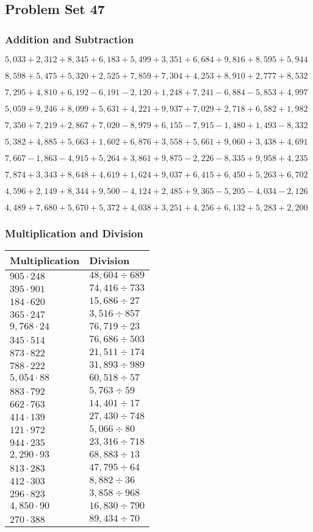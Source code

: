 \hypertarget{problem-set-47-2}{%
\subsection{Problem Set 47}\label{problem-set-47-2}}

\hypertarget{addition-and-subtraction-209}{%
\subsubsection{Addition and
Subtraction}\label{addition-and-subtraction-209}}

\(5,033+2,312+8,345+6,183+5,499+3,351+6,684+9,816+8,595+ 5,944\)

\(8,598+5,475+5,320+2,525+7,859+7,304+4,253+8,910+2,777+8,532\)

\(7,295+4,810+6,192-6,191-2,120+1,248+7,241-6,884-5,853+4,997\)

\(5,059+9,246+8,099+5,631+4,221+9,937+7,029+2,718+6,582+1,982\)

\(7,350+7,219+2,867+7,020-8,979+6,155-7,915-1,480+1,493-8,332\)

\(5,382+4,885+5,663+1,602+6,876+3,558+5,661+9,060+3,438+4,691\)

\(7,667-1,863-4,915+5,264+3,861+9,875-2,226-8,335+9,958+4,235\)

\(7,874+3,343+8,648+4,619+1,624+9,037+6,415+6,450+5,263+6,702\)

\(4,596+2,149+8,344+9,500-4,124+2,485+9,365-5,205-4,034-2,126\)

\(4,489+7,680+5,670+5,372+4,038+3,251+4,256+6,132+5,283+2,200\)

\hypertarget{multiplication-and-division-208}{%
\subsubsection{Multiplication and
Division}\label{multiplication-and-division-208}}

\begin{longtable}[]{@{}ll@{}}
\toprule
Multiplication & Division\tabularnewline
\midrule
\endhead
\(905\cdot248\) & \(48,604÷689\)\tabularnewline
\(395\cdot901\) & \(74,416÷733\)\tabularnewline
\(184\cdot620\) & \(15,686÷27\)\tabularnewline
\(365\cdot247\) & \(3,516÷857\)\tabularnewline
\(9,768\cdot24\) & \(76,719÷23\)\tabularnewline
\(345\cdot514\) & \(76,686÷503\)\tabularnewline
\(873\cdot822\) & \(21,511÷174\)\tabularnewline
\(788\cdot222\) & \(31,893÷989\)\tabularnewline
\(5,054\cdot88\) & \(60,518÷57\)\tabularnewline
\(883\cdot792\) & \(5,763÷59\)\tabularnewline
\(662\cdot763\) & \(14,401÷17\)\tabularnewline
\(414\cdot139\) & \(27,430÷748\)\tabularnewline
\(121\cdot972\) & \(5,066÷80\)\tabularnewline
\(944\cdot235\) & \(23,316÷718\)\tabularnewline
\(2,290\cdot93\) & \(68,883÷13\)\tabularnewline
\(813\cdot283\) & \(47,795÷64\)\tabularnewline
\(412\cdot303\) & \(8,882÷36\)\tabularnewline
\(296\cdot823\) & \(3,858÷968\)\tabularnewline
\(4,850\cdot90\) & \(16,830÷790\)\tabularnewline
\(270\cdot388\) & \(89,434÷70\)\tabularnewline
\bottomrule
\end{longtable}

